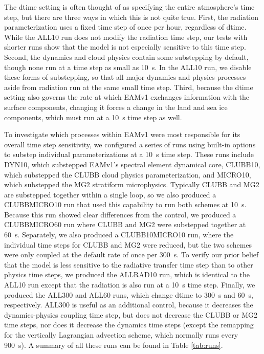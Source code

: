 \documentclass [11pt, proquest] {uwthesis}[2020/02/24]
\begin{document}
The dtime setting is often thought of as specifying the entire atmosphere's time step, but there are three ways in which this is not quite true. First, the radiation parameterization uses a fixed time step of once per hour, regardless of dtime. While the ALL10 run does not modify the radiation time step, our tests with shorter runs show that the model is not especially sensitive to this time step. Second, the dynamics and cloud physics contain some substepping by default, though none run at a time step as small as \SI{10}{\second}. In the ALL10 run, we disable these forms of substepping, so that all major dynamics and physics processes aside from radiation run at the same small time step. Third, because the dtime setting also governs the rate at which EAMv1 exchanges information with the surface components, changing it forces a change in the land and sea ice components, which must run at a \SI{10}{\second} time step as well.

To investigate which processes within EAMv1 were most responsible for its overall time step sensitivity, we configured a series of runs using built-in options to substep individual parameterizations at a \SI{10}{\second} time step. These runs include DYN10, which substepped EAMv1's spectral element dynamical core, CLUBB10, which substepped the CLUBB cloud physics parameterization, and MICRO10, which substepped the MG2 stratiform microphysics. Typically CLUBB and MG2 are substepped together within a single loop, so we also produced a CLUBBMICRO10 run that used this capability to run both schemes at \SI{10}{\second}. Because this run showed clear differences from the control, we produced a CLUBBMICRO60 run where CLUBB and MG2 were substepped together at \SI{60}{\second}. Separately, we also produced a CLUBB10MICRO10 run, where the individual time steps for CLUBB and MG2 were reduced, but the two schemes were only coupled at the default rate of once per \SI{300}{\second}. To verify our prior belief that the model is less sensitive to the radiative transfer time step than to other physics time steps, we produced the ALLRAD10 run, which is identical to the ALL10 run except that the radiation is also run at a \SI{10}{\second} time step. Finally, we produced the ALL300 and ALL60 runs, which change dtime to \SI{300}{\second} and \SI{60}{\second}, respectively. ALL300 is useful as an additional control, because it decreases the dynamics-physics coupling time step, but does not decrease the CLUBB or MG2 time steps, nor does it decrease the dynamics time steps (except the remapping for the vertically Lagrangian advection scheme, which normally runs every \SI{900}{\second}). A summary of all these runs can be found in Table \ref{tab:runs}.
\end{document}
